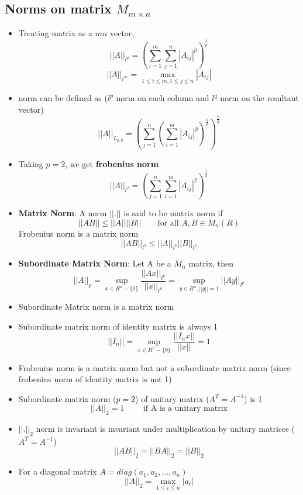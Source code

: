 \documentclass{article}
\begin{document}
\subsection{Norms on matrix $M_{m\times n}$}
	\begin{itemize}
	\item Treating matrix as a $mn$ vector, 
	\[||A||_{l^p} = \left( \sum_{i=1}^m \sum_{j=1}^n |A_{ij}|^p \right)^\frac{1}{p} \]
	\[||A||_{l^\infty} = \max_{1\leq i\leq m, 1 \leq j \leq n} |A_{ij}| \]

	\item norm can be defined as ($l^{p}$ norm on each column and $l^q$ norm on the resultant vector)
	\[||A||_{L_{p,q}} = \left( \sum_{j=1}^n \left(\sum_{i=1}^m |A_{ij}|^p \right)^\frac{q}{p} \right)^\frac{1}{q} \]

	\item Taking $p=2$, we get \textbf{frobenius norm}
		\[||A||_{l^2} = \left( \sum_{j=1}^n \sum_{i=1}^m |A_{ij}|^2  \right)^\frac{1}{2}  \]

	\item \textbf{Matrix Norm}: A norm $||.||$ is said to be matrix norm if 
		\[||AB|| \leq ||A|| ||B|| \qquad \text{for all } A,B\in M_n(R)\]
	Frobenius norm is a matrix norm
	\[||AB||_{l^2} \leq ||A||_{l^2} ||B||_{l^2}\]

	\item \textbf{Subordinate Matrix Norm}: Let A be a $M_n$ matrix, then 
		\[\boxed{||A||_p = \sup_{x\in R^n-\{0\}} \frac{||Ax||_{l^p}}{||x||_{l^p}} =  \sup_{y\in R^n, ||y||=1} {||Ay||_{l^p}}} \]
	\item Subordinate Matrix norm is a matrix norm

	\item Subordinate matrix norm of identity matrix is always 1
		\[||I_n|| = \sup_{x\in R^n-\{0\}} \frac{||I_nx||}{||x||} =1\]

	\item Frobenius norm is a matrix norm but not a subordinate matrix norm (since frobenius norm of identity matrix is not 1)

	\item Subordinate matrix norm ($p=2$) of unitary matrix ($A^T = A^{-1}$) is 1
		\[||A||_2 = 1 \qquad \text{ if A is a unitary matrix}\]

	\item $||.||_2$ norm is invariant is invariant under multiplication by unitary matrices ($A^T = A^{-1} $)
		\[||AB||_2 = ||BA||_2 = ||B||_2 \]

	\item For a diagonal matrix $A = diag(a_1,a_2,\hdots,a_n)$
		\[||A||_2 = \max_{1 \leq i\leq n} |a_i|\]

	\end{itemize}
\end{document}
